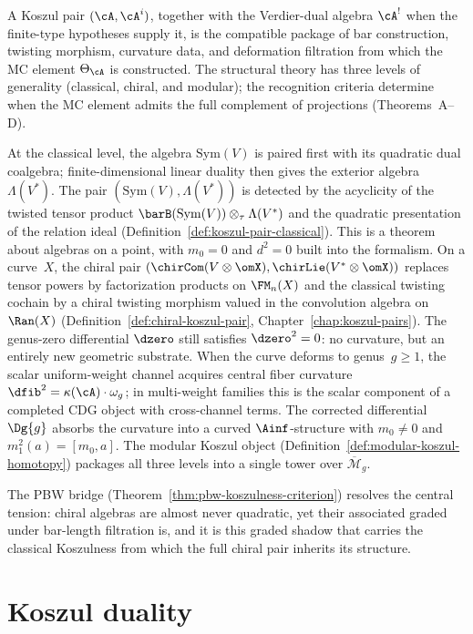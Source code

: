 A Koszul pair $(\cA,\cA^i)$, together with the Verdier-dual algebra
$\cA^!$ when the finite-type hypotheses supply it, is the compatible
package of bar construction, twisting morphism, curvature data, and
deformation filtration from which the MC element $\Theta_\cA$ is
constructed.  The structural theory has three levels of generality
(classical, chiral, and modular); the recognition criteria determine
when the MC element admits the full complement of projections
(Theorems~A--D).

At the classical level, the algebra $\mathrm{Sym}(V)$ is paired first
with its quadratic dual coalgebra; finite-dimensional linear duality
then gives the exterior algebra $\Lambda(V^*)$.  The pair
$(\mathrm{Sym}(V), \Lambda(V^*))$ is detected by the acyclicity of the
twisted tensor product
$\barB(\mathrm{Sym}(V)) \otimes_\tau \Lambda(V^*)$ and the quadratic
presentation of the relation ideal
(Definition~\ref{def:koszul-pair-classical}). This is a theorem about
algebras on a point, with $m_0 = 0$ and $d^2 = 0$ built into the
formalism. On a curve~$X$, the chiral pair
$(\chirCom(V \otimes \omX), \chirLie(V^* \otimes \omX))$ replaces
tensor powers by factorization products on $\FM_n(X)$ and the
classical twisting cochain by a chiral twisting morphism valued in the
convolution algebra on $\Ran(X)$
(Definition~\ref{def:chiral-koszul-pair}, Chapter~\ref{chap:koszul-pairs}).
The genus-zero differential $\dzero$ still satisfies $\dzero^2 = 0$:
no curvature, but an entirely new geometric substrate. When the curve
deforms to genus~$g \geq 1$, the scalar uniform-weight channel
acquires central fiber curvature
$\dfib^2 = \kappa(\cA) \cdot \omega_g$; in multi-weight families this
is the scalar component of a completed CDG object with cross-channel
terms.  The corrected differential $\Dg{g}$ absorbs the curvature into
a curved $\Ainf$-structure with $m_0 \neq 0$ and
$m_1^2(a) = [m_0, a]$. The modular Koszul object
(Definition~\ref{def:modular-koszul-homotopy}) packages all three
levels into a single tower over $\overline{\mathcal{M}}_g$.

The PBW bridge (Theorem~\ref{thm:pbw-koszulness-criterion}) resolves
the central tension: chiral algebras are almost never quadratic, yet
their associated graded under bar-length filtration is, and it is this
graded shadow that carries the classical Koszulness from which the
full chiral pair inherits its structure.


\section{Koszul duality}

